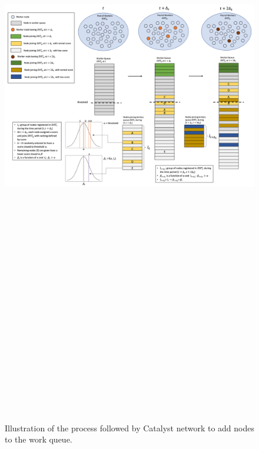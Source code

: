 \newpage
\begin{landscape}
\begin{figure}
    \includegraphics[width=22cm,height=42cm,keepaspectratio]{Figures/Work_Queue_Management}
    \caption{\label{fig:NSM}Illustration of the process followed by Catalyst network to add nodes to the work queue.}
\end{figure}
\end{landscape}

